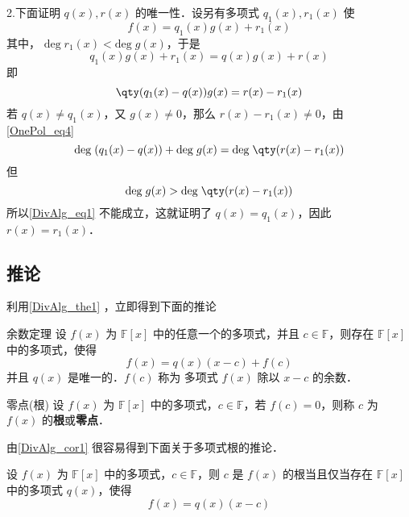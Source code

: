 2.下面证明 $q(x),r(x)$ 的唯一性．设另有多项式 $q_1(x),r_1(x)$ 使
\begin{equation}
f(x)=q_1(x)g(x)+r_1(x)
\end{equation}
其中， $\mathrm{deg}\;r_1(x)<\mathrm{deg}\;g(x)$，于是
\begin{equation}
q_1(x)g(x)+r_1(x)=q(x)g(x)+r(x)
\end{equation}
即
\begin{equation}
\qty(q_1(x)-q(x))g(x)=r(x)-r_1(x)
\end{equation}
若 $q(x)\neq q_1(x)$，又 $g(x)\neq 0$，那么 $r(x)-r_1(x)\neq 0$，由\autoref{OnePol_eq4}~
\begin{equation}\label{DivAlg_eq1}
\mathrm{deg}\;(q_1(x)-q(x))+\mathrm{deg}\;g(x)=\mathrm{deg}\;\qty(r(x)-r_1(x))
\end{equation}
但
\begin{equation}
\mathrm{deg}\;g(x)>\mathrm{deg}\;\qty(r(x)-r_1(x))
\end{equation}
所以\autoref{DivAlg_eq1} 不能成立，这就证明了
$q(x)=q_1(x)$，因此 $r(x)=r_1(x)$．
\subsection{推论}
利用\autoref{DivAlg_the1} ，立即得到下面的推论
\begin{corollary}{余数定理}\label{DivAlg_cor1}
设 $f(x)$ 为 $\mathbb{F}[x]$ 中的任意一个的多项式，并且 $c\in\mathbb{F}$，则存在 $\mathbb{F}[x]$ 中的多项式，使得
\begin{equation}
f(x)=q(x)(x-c)+f(c)
\end{equation}
并且 $q(x)$ 是唯一的．$f(c)$ 称为 多项式 $f(x)$ 除以 $x-c$ 的余数．
\end{corollary}
\begin{definition}{零点(根)}
设 $f(x)$ 为 $\mathbb{F}[x]$ 中的多项式，$c\in\mathbb{F}$，若 $f(c)=0$，则称 $c$ 为 $f(x)$ 的\textbf{根}或\textbf{零点}．
\end{definition}
由\autoref{DivAlg_cor1} 很容易得到下面关于多项式根的推论．
\begin{corollary}{}
设 $f(x)$ 为 $\mathbb{F}[x]$ 中的多项式，$c\in\mathbb{F}$，则 $c$ 是 $f(x)$ 的根当且仅当存在 $\mathbb{F}[x]$ 中的多项式 $q(x)$，使得
\begin{equation}
f(x)=q(x)(x-c)
\end{equation}

\end{corollary}